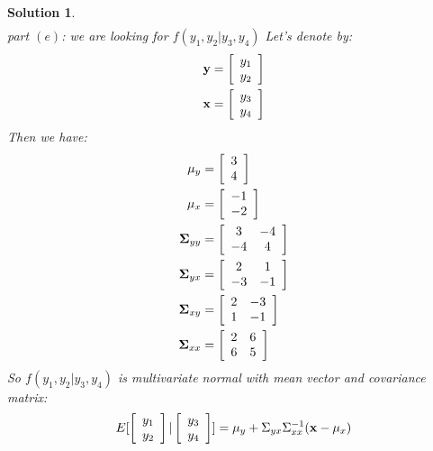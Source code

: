 \documentclass[11pt]{article}
\newtheorem{sol}{Solution}
\begin{document}
\begin{sol}
\begin{align*}
	\end{align*}
	part $(e)$:\vskip 2mm
	we are looking for $f(y_1, y_2|y_3, y_4)$\vskip 2mm
	Let's denote by:
	\begin{align*}
		{\bf y} &= \left[\begin{array}{c} y_1\\ y_2\end{array}\right]\\
		{\bf x} &= \left[\begin{array}{c} y_3\\ y_4\end{array}\right]
	\end{align*}
	Then we have:
	\begin{align*}
		{\bf \mu}_y &=  \left[\begin{array}{c} 3\\ 4\end{array}\right]\\
		{\bf \mu}_x &=  \left[\begin{array}{c} -1\\ -2\end{array}\right]\\
		{\bf \Sigma}_{yy} &= \left[\begin{array}{cc} 3&-4 \\ -4& 4\end{array}\right]\\
		{\bf \Sigma}_{yx} &= \left[\begin{array}{cc} 2& 1\\ -3&-1 \end{array}\right]\\
		{\bf \Sigma}_{xy} &= \left[\begin{array}{cc}2 &-3 \\ 1& -1\end{array}\right]\\
		{\bf \Sigma}_{xx} &= \left[\begin{array}{cc} 2& 6\\ 6&5 \end{array}\right]
	\end{align*}
	So $f(y_1, y_2|y_3, y_4)$ is multivariate normal with mean vector and covariance matrix:
	\begin{align*}
		E[\left[\begin{array}{c} y_1\\ y_2\end{array}\right]|\left[\begin{array}{c} y_3\\ y_4\end{array}\right]] &= {\bf \mu}_y + \Sigma_{yx}\Sigma_{xx}^{-1}({\bf x} - {\bf \mu}_x)\\

\end{align*}
\end{sol}
\end{document}
